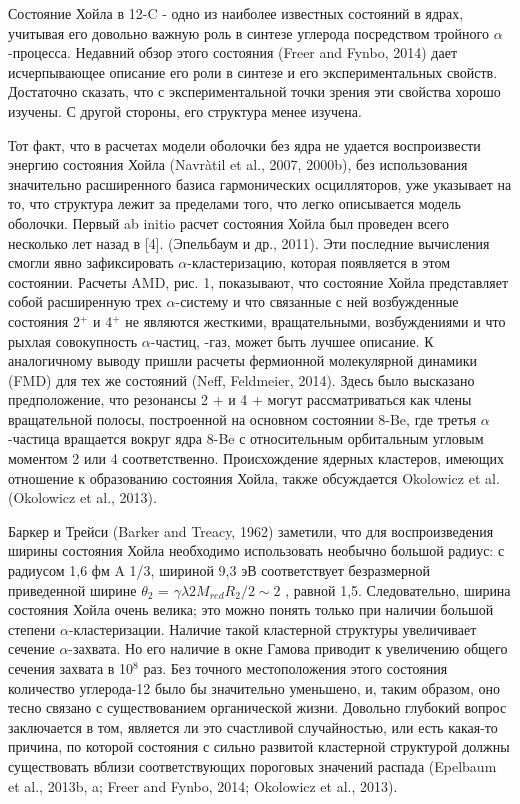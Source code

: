 \documentclass[fontsize=14pt]{scrarticle}
\begin{document}
Состояние Хойла в 12-C - одно из наиболее известных состояний в ядрах, учитывая его довольно важную роль в синтезе углерода посредством тройного $\alpha$-процесса. Недавний обзор этого состояния (Freer and Fynbo, 2014) дает исчерпывающее описание его роли в синтезе и его экспериментальных свойств. Достаточно сказать, что с экспериментальной точки зрения эти свойства хорошо изучены. С другой стороны, его структура менее изучена.

Тот факт, что в расчетах модели оболочки без ядра не удается воспроизвести энергию состояния Хойла (Navr\`{a}til et al., 2007, 2000b), без использования значительно расширенного базиса гармонических осцилляторов, уже указывает на то, что структура лежит за пределами того, что легко описывается модель оболочки. Первый ab initio расчет состояния Хойла был проведен всего несколько лет назад в [4]. (Эпельбаум и др., 2011). Эти последние вычисления смогли явно зафиксировать $\alpha$-кластеризацию, которая появляется в этом состоянии. Расчеты AMD, рис. 1, показывают, что состояние Хойла представляет собой расширенную трех $\alpha$-систему и что связанные с ней возбужденные состояния 2$^{+}$ и 4$^{+}$ не являются жесткими, вращательными, возбуждениями и что рыхлая совокупность $\alpha$-частиц, -газ, может быть лучшее описание. К аналогичному выводу пришли расчеты фермионной молекулярной динамики (FMD) для тех же состояний (Neff, Feldmeier, 2014). Здесь было высказано предположение, что резонансы 2 + и 4 + могут рассматриваться как члены вращательной полосы, построенной на основном состоянии 8-Be, где третья $\alpha$-частица вращается вокруг ядра 8-Be с относительным орбитальным угловым моментом 2 или 4 соответственно. Происхождение ядерных кластеров, имеющих отношение к образованию состояния Хойла, также обсуждается Okolowicz et al. (Okolowicz et al., 2013).

Баркер и Трейси (Barker and Treacy, 1962) заметили, что для воспроизведения ширины состояния Хойла необходимо использовать необычно большой радиус: с радиусом 1,6 фм A 1/3, шириной 9,3 эВ соответствует безразмерной приведенной ширине $\theta_{2}$ = $\gamma\lambda 2 M_{red}R_{2}/2\sim 2$ , равной 1,5. Следовательно, ширина состояния Хойла очень велика; это можно понять только при наличии большой степени $\alpha$-кластеризации. Наличие такой кластерной структуры увеличивает сечение $\alpha$-захвата. Но его наличие в окне Гамова приводит к увеличению общего сечения захвата в 10$^{8}$ раз. Без точного местоположения этого состояния количество углерода-12 было бы значительно уменьшено, и, таким образом, оно тесно связано с существованием органической жизни. Довольно глубокий вопрос заключается в том, является ли это счастливой случайностью, или есть какая-то причина, по которой состояния с сильно развитой кластерной структурой должны существовать вблизи соответствующих пороговых значений распада (Epelbaum et al., 2013b, a; Freer and Fynbo, 2014; Okolowicz et al., 2013).
\end{document}
